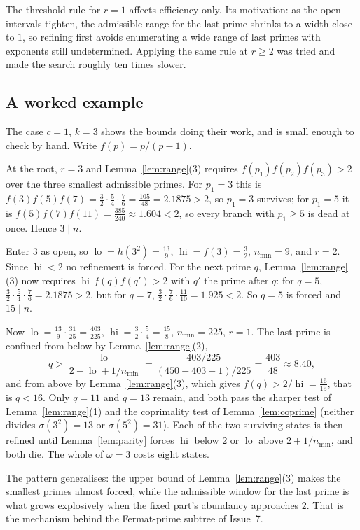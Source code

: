 \documentclass[11pt]{amsart}
\theoremstyle{remark}
\DeclareMathOperator{\lo}{lo}
\DeclareMathOperator{\hi}{hi}
\begin{document}
The threshold rule for $r = 1$ affects efficiency only. Its motivation: as the
open intervals tighten, the admissible range for the last prime shrinks to a
width close to $1$, so refining first avoids enumerating a wide range of last
primes with exponents still undetermined. Applying the same rule at $r \ge 2$
was tried and made the search roughly ten times slower.

\subsection{A worked example}\label{sec:worked}
The case $c = 1$, $k = 3$ shows the bounds doing their work, and is small enough
to check by hand. Write $f(p) = p/(p-1)$.

At the root, $r = 3$ and Lemma~\ref{lem:range}(3) requires
$f(p_1)f(p_2)f(p_3) > 2$ over the three smallest admissible primes. For
$p_1 = 3$ this is $f(3)f(5)f(7) = \tfrac32\cdot\tfrac54\cdot\tfrac76
= \tfrac{105}{48} = 2.1875 > 2$, so $p_1 = 3$ survives; for $p_1 = 5$ it is
$f(5)f(7)f(11) = \tfrac{385}{240} \approx 1.604 < 2$, so every branch with
$p_1 \ge 5$ is dead at once. Hence $3 \mid n$.

Enter $3$ as open, so $\lo = h(3^2) = \tfrac{13}{9}$, $\hi = f(3) = \tfrac32$,
$n_{\min} = 9$, and $r = 2$. Since $\hi < 2$ no refinement is forced. For the
next prime $q$, Lemma~\ref{lem:range}(3) now requires
$\hi\, f(q) f(q') > 2$ with $q'$ the prime after $q$: for $q = 5$,
$\tfrac32\cdot\tfrac54\cdot\tfrac76 = 2.1875 > 2$, but for $q = 7$,
$\tfrac32\cdot\tfrac76\cdot\tfrac{11}{10} = 1.925 < 2$. So $q = 5$ is forced and
$15 \mid n$.

Now $\lo = \tfrac{13}{9}\cdot\tfrac{31}{25} = \tfrac{403}{225}$,
$\hi = \tfrac32\cdot\tfrac54 = \tfrac{15}{8}$, $n_{\min} = 225$, $r = 1$. The
last prime is confined from below by Lemma~\ref{lem:range}(2),
\[
  q > \frac{\lo}{2 - \lo + 1/n_{\min}}
    = \frac{403/225}{(450 - 403 + 1)/225} = \frac{403}{48} \approx 8.40,
\]
and from above by Lemma~\ref{lem:range}(3), which gives
$f(q) > 2/\hi = \tfrac{16}{15}$, that is $q < 16$. Only $q = 11$ and $q = 13$
remain, and both pass the sharper test of Lemma~\ref{lem:range}(1) and the
coprimality test of Lemma~\ref{lem:coprime} (neither divides
$\sigma(3^2) = 13$ or $\sigma(5^2) = 31$). Each of the two surviving states is
then refined until Lemma~\ref{lem:parity} forces $\hi$ below $2$ or $\lo$ above
$2 + 1/n_{\min}$, and both die. The whole of $\omega = 3$ costs eight states.

The pattern generalises: the upper bound of Lemma~\ref{lem:range}(3) makes the
smallest primes almost forced, while the admissible window for the last prime
is what grows explosively when the fixed part's abundancy approaches $2$. That
is the mechanism behind the Fermat-prime subtree of Issue~7.
\end{document}
